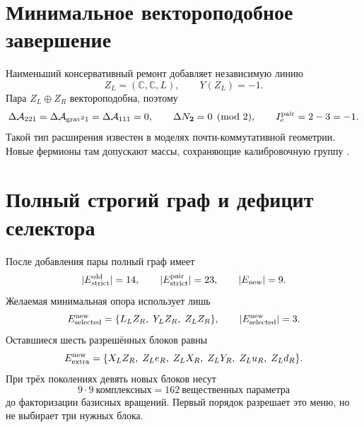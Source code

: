 \section{Минимальное вектороподобное завершение}

Наименьший консервативный ремонт добавляет независимую линию
\begin{equation}
 Z_L=(\mathbb C,\mathbb C,L),
 \qquad Y(Z_L)=-1.
 \label{eq:v8-isotypic-extension-left-partner}
\end{equation}
Пара $Z_L\oplus Z_R$ вектороподобна, поэтому
\begin{equation}
 \Delta\mathcal A_{221}
 =\Delta\mathcal A_{\mathrm{grav}^21}
 =\Delta\mathcal A_{111}=0,
 \qquad
 \Delta N_{\mathbf2}=0\pmod2,
 \qquad
 I_e^{\rm pair}=2-3=-1.
 \label{eq:v8-isotypic-extension-pair-admission}
\end{equation}
Такой тип расширения известен в моделях почти-коммутативной геометрии.
Новые фермионы там допускают массы, сохраняющие калибровочную группу
\cite{v8-isotypic-extension-vectorlike}.

\section{Полный строгий граф и дефицит селектора}

После добавления пары полный граф имеет
\begin{equation}
 |E_{\rm strict}^{\rm old}|=14,
 \qquad
 |E_{\rm strict}^{\rm pair}|=23,
 \qquad
 |E_{\rm new}|=9.
 \label{eq:v8-isotypic-extension-edge-count}
\end{equation}
Желаемая минимальная опора использует лишь
\begin{equation}
 E_{\rm selected}^{\rm new}
 =\{L_LZ_R,\;Y_LZ_R,\;Z_LZ_R\},
 \qquad
 |E_{\rm selected}^{\rm new}|=3.
 \label{eq:v8-isotypic-extension-selected-edges}
\end{equation}
Оставшиеся шесть разрешённых блоков равны
\begin{equation}
 E_{\rm extra}^{\rm new}
 =\{X_LZ_R,\;Z_Le_R,\;Z_LX_R,\;Z_LY_R,\;Z_Lu_R,\;Z_Ld_R\}.
 \label{eq:v8-isotypic-extension-extra-edges}
\end{equation}
При трёх поколениях девять новых блоков несут
\begin{equation}
 9\cdot9\ \text{комплексных}
 =162\ \text{вещественных параметра}
 \label{eq:v8-isotypic-extension-yukawa-cost}
\end{equation}
до факторизации базисных вращений. Первый порядок разрешает это меню, но не
выбирает три нужных блока.

